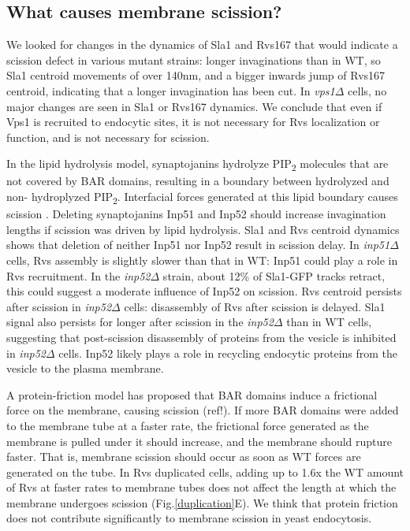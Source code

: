 \documentclass[9pt,lineno]{elife}
\begin{document}
\subsection{What causes membrane scission?}
We looked for changes in the dynamics of Sla1 and Rvs167 that would indicate a scission defect in various mutant strains: longer invaginations than in WT, so Sla1 centroid movements of over 140nm, and a bigger inwards jump of Rvs167 centroid, indicating that a longer invagination has been cut. In \textit{vps1$\Delta$}  cells, no major changes are seen in Sla1 or Rvs167 dynamics. We conclude that even if Vps1 is recruited to endocytic sites, it is not necessary for Rvs localization or function, and is not necessary for scission. 

In the lipid hydrolysis model, synaptojanins hydrolyze PIP\textsubscript{2}  molecules that are not covered by BAR domains, resulting in a boundary between hydrolyzed and non- hydroplyzed PIP\textsubscript{2}. Interfacial forces generated at this lipid boundary causes scission \citep{Liu2006}. Deleting  synaptojanins Inp51 and Inp52 should increase invagination lengths if scission was driven by lipid hydrolysis. Sla1 and Rvs centroid dynamics shows that deletion of neither Inp51 nor Inp52 result in scission delay. In \textit{inp51$\Delta$}  cells, Rvs assembly is slightly slower than that in WT: Inp51 could play a role in Rvs recruitment. In the \textit{inp52$\Delta$}  strain, about 12\% of Sla1-GFP tracks retract, this could suggest a moderate influence of Inp52 on scission. Rvs centroid persists after scission in \textit{inp52$\Delta$}  cells: disassembly of Rvs after scission is delayed. Sla1 signal also persists for longer after scission in the \textit{inp52$\Delta$} than in WT cells, suggesting that post-scission disassembly of proteins from the vesicle is inhibited in \textit{inp52$\Delta$}  cells. Inp52 likely plays a role in recycling endocytic proteins from the vesicle to the plasma membrane. 

A protein-friction model has proposed that BAR domains induce a frictional force on the membrane, causing scission (ref!). If more BAR domains were added to the membrane tube at a faster rate, the frictional  force generated as the membrane is pulled under it should increase, and the membrane should rupture faster. That is, membrane scission should occur as soon as WT forces are generated on the tube. In Rvs duplicated cells, adding up to 1.6x the WT amount of Rvs at faster rates to membrane tubes does not affect the length at which the membrane undergoes scission (Fig.\ref{duplication}E). We think that protein friction does not contribute significantly to membrane scission in yeast endocytosis. 
\end{document}
